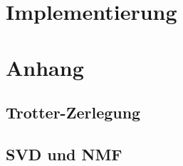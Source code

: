 \documentclass[10pt,a4paper]{report}
\begin{document}
\chapter{Implementierung}


\chapter{Anhang}
\section{Trotter-Zerlegung}

\section{SVD und NMF}


 

\end{document}
